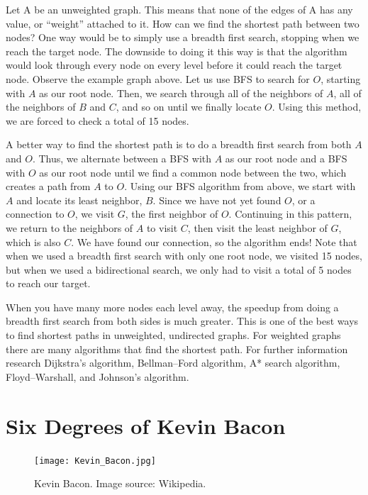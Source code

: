 Let A be an unweighted graph. This means that none of the edges of A has any value, or ``weight'' attached to it. How can we find the shortest path between two nodes? One way would be to simply use a breadth first search, stopping when we reach the target node. The downside to doing it this way is that the algorithm would look through every node on every level before it could reach the target node. Observe the example graph above. Let us use BFS to search for $O$, starting with $A$ as our root node. Then, we search through all of the neighbors of $A$,  all of the neighbors of $B$ and $C$, and so on until we finally locate $O$. Using this method, we are forced to check a total of 15 nodes.

A better way to find the shortest path is to do a breadth first search from both $A$ and $O$. Thus, we alternate between a BFS with $A$ as our root node and a BFS with $O$ as our root node until we find a common node between the two, which creates a path from $A$ to $O$.  Using our BFS algorithm from above, we start with $A$ and locate its least neighbor, $B$. Since we have not yet found $O$, or a connection to $O$, we visit $G$, the first neighbor of $O$. Continuing in this pattern, we return to the neighbors of $A$ to visit $C$, then visit the least neighbor of $G$, which is also $C$. We have found our connection, so the algorithm ends! Note that when we used a breadth first search with only one root node, we visited 15 nodes, but when we used a bidirectional search, we only had to visit a total of 5 nodes to reach our target.

When you have many more nodes each level away, the speedup from doing a breadth first search from both sides is much greater. This is one of the best ways to find shortest paths in unweighted, undirected graphs. For weighted graphs there are many algorithms that find the shortest path. For further information research Dijkstra's algorithm, Bellman–Ford algorithm, A* search algorithm, Floyd–Warshall, and Johnson's algorithm.

\section*{Six Degrees of Kevin Bacon}
\begin{figure}[h]
\texttt{[image: Kevin\_Bacon.jpg]}
\caption{Kevin Bacon.  Image source: Wikipedia.}
\end{figure}

